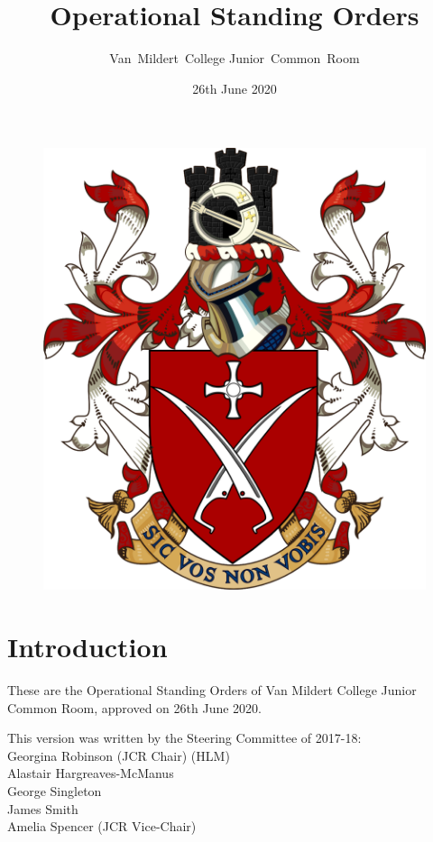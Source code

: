 \documentclass[12pt]{article}
\title{Operational Standing Orders}
\author{Van~Mildert~College Junior~Common~Room}
\date{26th June 2020}
\begin{document}
\begin{titlepage}  %
    \maketitle
    \begin{figure}[h]
    \includegraphics[scale=0.25]{arms}  %
    \centering
    \end{figure}
    \thispagestyle{empty}
\end{titlepage}

\setcounter{page}{2}  %
\section*{Introduction}
These are the Operational Standing Orders of Van Mildert College Junior Common Room, approved on 26th June 2020.

This version was written by the Steering Committee of 2017-18:\\
\hspace*{2cm}Georgina Robinson (JCR Chair) (HLM)\\
\hspace*{2cm}Alastair Hargreaves-McManus\\
\hspace*{2cm}George Singleton\\
\hspace*{2cm}James Smith\\
\hspace*{2cm}Amelia Spencer (JCR Vice-Chair)
\end{document}
